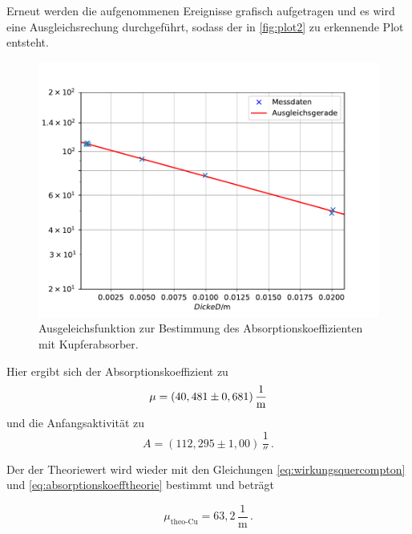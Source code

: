   Erneut werden die aufgenommenen Ereignisse grafisch aufgetragen und es wird eine Ausgleichsrechung durchgeführt, sodass der in \autoref{fig:plot2} zu erkennende Plot entsteht.

  \begin{figure}[H]
      \centering
      \includegraphics{figures/GammaKupfer2.pdf}
      \caption{Ausgeleichsfunktion zur Bestimmung des Absorptionskoeffizienten mit Kupferabsorber.}
      \label{fig:plot2}
  \end{figure}

Hier ergibt sich der Absorptionskoeffizient zu
\begin{equation*}
    \mu =  \left(40,481 \pm 0,681\right) \unit{\frac{1}{\meter}}
\end{equation*}
und die Anfangsaktivität zu
\begin{equation*}
    A = (112,295 \pm 1,00) \, \unit{\frac{1}{\second}} \,.
\end{equation*}

Der der Theoriewert wird wieder mit den Gleichungen \eqref{eq:wirkungsquercompton} und  \eqref{eq:absorptionskoefftheorie} bestimmt und beträgt%

\begin{equation*}
    \mu_{\text{theo-Cu}} = 63,2  \, \dfrac{1}{\unit{\meter}} \, .%
    \label{eq:absorpttheoCu}
\end{equation*}

